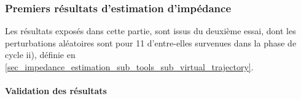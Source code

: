 \documentclass[12pt, a4paper]{article} %
\numberwithin{equation}{section}
\begin{document}
\subsubsection{Premiers résultats d'estimation d'impédance}
\label{sec_impedance_estimation_sub_results_sub_impedance_results}

Les résultats exposés dans cette partie, sont issus du deuxième essai, dont les perturbations aléatoires sont pour 11 d'entre-elles survenues dans la phase de cycle ii), définie en \cref{sec_impedance_estimation_sub_tools_sub_virtual_trajectory}.
%
\newlineBlank
% 
%
% 

\paragraph{Validation des résultats} \label{sec_impedance_estimation_sub_results_sub_impedance_results_par_validity}
\end{document}
